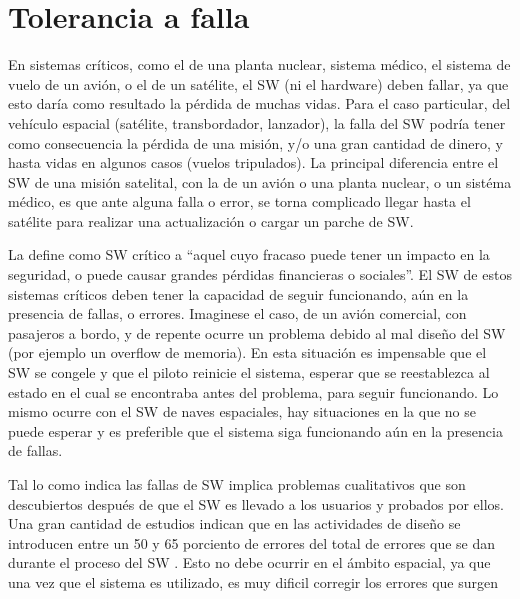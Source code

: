 \section{Tolerancia a falla}\label{chap:FaultTolerance}
En sistemas críticos, como el de una planta nuclear, sistema médico, el sistema de vuelo 
de un avión, o el de un satélite, el \ac{SW} (ni el hardware) deben fallar, ya que esto daría 
como resultado la pérdida de muchas vidas. Para el caso particular, del vehículo espacial 
(satélite, transbordador, lanzador), la falla del \ac{SW} podría tener como consecuencia la 
pérdida de una misión, y/o una gran cantidad de dinero, y hasta vidas en algunos casos (vuelos 
tripulados). La principal diferencia entre el \ac{SW} de una misión satelital, con la de un avión 
o una planta nuclear, o un sistéma médico, es que ante alguna falla o error, se torna complicado 
llegar hasta el satélite para realizar una actualización o cargar un parche de \ac{SW}.

La \cite{IEEE610.12} define como \ac{SW} crítico a ``aquel cuyo fracaso puede tener un impacto en 
la seguridad, o puede causar grandes pérdidas financieras o sociales''. El \ac{SW} de estos 
sistemas críticos deben tener la capacidad de seguir funcionando, aún en la presencia de fallas, o 
errores. Imaginese el caso, de un avión comercial, con pasajeros a bordo, y de repente ocurre un 
problema debido al mal diseño del \ac{SW} (por ejemplo un overflow de memoria). En esta situación 
es impensable que el \ac{SW} se congele y que el piloto reinicie el sistema, esperar que se 
reestablezca al estado en el cual se encontraba antes del problema, para seguir funcionando. Lo 
mismo ocurre con el \ac{SW} de naves espaciales, hay situaciones en la que no se puede esperar y es 
preferible que el sistema siga funcionando aún en la presencia de fallas.

Tal lo como indica \cite{pressman01} las fallas de \ac{SW} implica problemas cualitativos que son 
descubiertos después de que el \ac{SW} es llevado a los usuarios y probados por ellos. Una 
gran cantidad de estudios indican que en las actividades de diseño se introducen entre un 50 y 65 
porciento de errores del total de errores que se dan durante el proceso del \ac{SW} 
\citep{pressman01}. Esto no debe ocurrir en el ámbito espacial, ya que una vez que el sistema es 
utilizado, es muy dificil corregir los errores que surgen 

